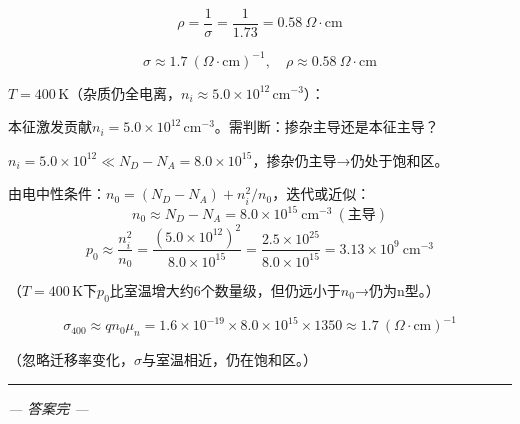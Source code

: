 \documentclass[12pt,a4paper]{ctexart}
\begin{document}
\[
\rho = \frac{1}{\sigma} = \frac{1}{1.73} = 0.58\ \Omega\cdot\text{cm}
\]

\[
\boxed{\sigma \approx 1.7\ (\Omega\cdot\text{cm})^{-1},\quad \rho \approx 0.58\ \Omega\cdot\text{cm}}
\]

\textbf{$T = 400\,\text{K}$}（杂质仍全电离，$n_i \approx 5.0\times10^{12}\,\text{cm}^{-3}$）：

本征激发贡献$n_i = 5.0\times10^{12}\,\text{cm}^{-3}$。需判断：掺杂主导还是本征主导？

$n_i = 5.0\times10^{12} \ll N_D - N_A = 8.0\times10^{15}$，掺杂仍主导→仍处于饱和区。

由电中性条件：$n_0 = (N_D - N_A) + n_i^2/n_0$，迭代或近似：
\[
n_0 \approx N_D - N_A = 8.0\times10^{15}\ \text{cm}^{-3}\ (\text{主导})
\]
\[
p_0 \approx \frac{n_i^2}{n_0}
= \frac{(5.0\times10^{12})^2}{8.0\times10^{15}}
= \frac{2.5\times10^{25}}{8.0\times10^{15}}
= 3.13\times10^9\ \text{cm}^{-3}
\]

（$T=400\,\text{K}$下$p_0$比室温增大约6个数量级，但仍远小于$n_0$→仍为n型。）

\[
\sigma_{400} \approx q n_0 \mu_n
= 1.6\times10^{-19} \times 8.0\times10^{15} \times 1350
\approx \boxed{1.7\ (\Omega\cdot\text{cm})^{-1}}
\]

（忽略迁移率变化，$\sigma$与室温相近，仍在饱和区。）

\vspace{8pt}
\hrule
\vspace{8pt}

\begin{center}
\textit{--- 答案完 ---}
\end{center}
\end{document}
